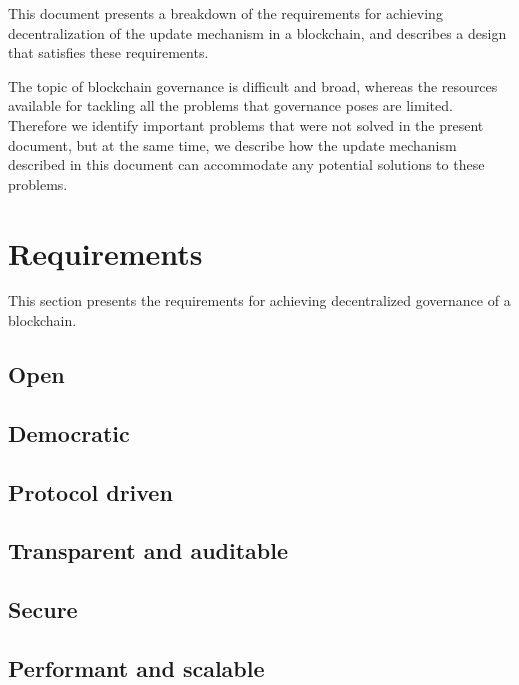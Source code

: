 \documentclass[11pt,a4paper]{article}
\begin{document}
This document presents a breakdown of the requirements for achieving
decentralization of the update mechanism in a blockchain, and describes a design
that satisfies these requirements.

The topic of blockchain governance is difficult and broad, whereas the resources
available for tackling all the problems that governance poses are limited.
Therefore we identify important problems that were not solved in the present
document, but at the same time, we describe how the update mechanism described
in this document can accommodate any potential solutions to these problems.


\section{Requirements}
\label{sec:requirements}

This section presents the requirements for achieving decentralized governance of
a blockchain.

\subsection{Open}
\label{sec:open-participation}

\subsection{Democratic}
\label{sec:decentr-decis-making}

\subsection{Protocol driven}
\label{sec:protocol-driven}

\subsection{Transparent and auditable}
\label{sec:transp-audit}

\subsection{Secure}
\label{sec:secure}

\subsection{Performant and scalable}
\label{sec:performant-scalable}
\end{document}
